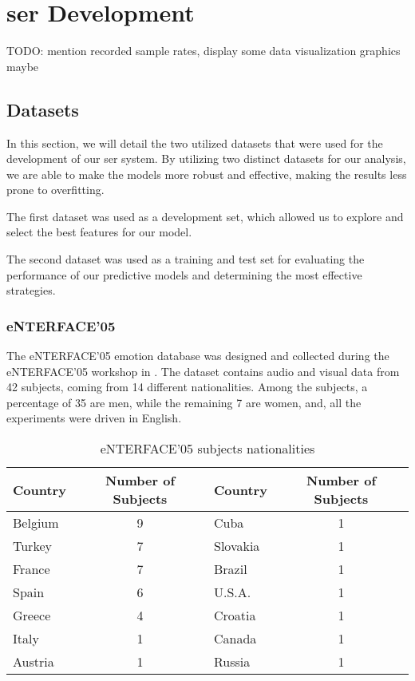 \chapter{\ac{ser} Development}
\label{chapter:strat}


TODO: mention recorded sample rates, display some data visualization graphics maybe



\section{Datasets}

In this section, we will detail the two utilized datasets that were used for the development of our \ac{ser} system.
By utilizing two distinct datasets for our analysis, we are able to make the models more robust and effective, making the results less prone to overfitting.

The first dataset was used as a development set, which allowed us to explore and select the best features for our model.

The second dataset was used as a training and test set for evaluating the performance of our predictive models and determining the most effective strategies.

\subsection{eNTERFACE'05}

The eNTERFACE’05 emotion database \cite{Martin2006} was designed and collected during the eNTERFACE’05 workshop in \citeyear{Martin2006}. The dataset contains audio and visual data from 42 subjects, coming from 14 different nationalities. Among the subjects, a percentage of 35 are men, while the remaining 7 are women, and, all the experiments were driven in English.

\begin{table}[H]
	\centering
	\caption{eNTERFACE'05 subjects nationalities}
	\label{tab:enterfaceDiversity}
	\begin{tabular}{lc|lc}
		\toprule
		Country &Number of Subjects &Country &Number of Subjects\\
		\midrule
		Belgium & 9 & Cuba     & 1\\
		Turkey  & 7 & Slovakia & 1\\
		France  & 7 & Brazil   & 1\\
		Spain   & 6 & U.S.A.   & 1\\
		Greece  & 4 & Croatia  & 1\\
		Italy   & 1 & Canada   & 1\\
		Austria & 1 & Russia   & 1\\
		\bottomrule
	\end{tabular}
\end{table}


